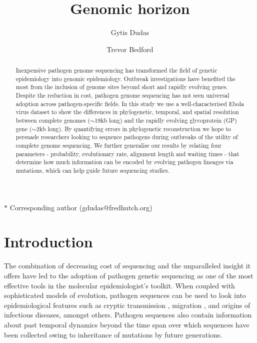 \documentclass[11pt,oneside,letterpaper]{article}
\title{\vspace{1.0cm} \LARGE \bf Genomic horizon}
\author[1$\ast$]{Gytis Dudas}
\author[1]{Trevor Bedford}
\affil[1]{Vaccine and Infectious Disease Division, Fred Hutchinson Cancer Research Center, Seattle, WA, USA}
\begin{document}
\maketitle

\begin{abstract}
Inexpensive pathogen genome sequencing has transformed the field of genetic epidemiology into genomic epidemiology.
Outbreak investigations have benefited the most from the inclusion of genome sites beyond short and rapidly evolving genes.
Despite the reduction in cost, pathogen genome sequencing has not seen universal adoption across pathogen-specific fields.
In this study we use a well-characterised Ebola virus dataset to show the differences in phylogenetic, temporal, and spatial resolution between complete genomes ($\sim$19kb long) and the rapidly evolving glycoprotein (GP) gene ($\sim$2kb long).
By quantifying errors in phylogenetic reconstruction we hope to persuade researchers looking to sequence pathogens during outbreaks of the utility of complete genome sequencing.
We further generalise our results by relating four parameters - probability, evolutionary rate, alignment length and waiting times - that determine how much information can be encoded by evolving pathogen lineages via mutations, which can help guide future sequencing studies.
\end{abstract}

$\ast$ \footnotesize{Corresponding author (gdudas@fredhutch.org)}

\pagebreak

\section*{Introduction}
The combination of decreasing cost of sequencing and the unparalleled insight it offers have led to the adoption of pathogen genetic sequencing as one of the most effective tools in the molecular epidemiologist's toolkit.
When coupled with sophisticated models of evolution, pathogen sequences can be used to look into epidemiological features such as cryptic transmission \citep{faria_establishment_2017}, migration \citep{dudas_virus_2017}, and origins \citep{smith_origins_2009} of infectious diseases, amongst others.
Pathogen sequences also contain information about past temporal dynamics beyond the time span over which sequences have been collected \citep{raghwani_origin_2012} owing to inheritance of mutations by future generations.
\end{document}
